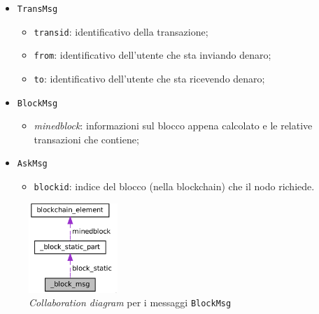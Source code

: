 \begin{itemize}
    \item \texttt{TransMsg}
    \begin{itemize}
        \item \texttt{transid}: identificativo della transazione;
        \item \texttt{from}: identificativo dell'utente che sta inviando denaro;
        \item \texttt{to}: identificativo dell'utente che sta ricevendo denaro;
    \end{itemize}
    \item \texttt{BlockMsg}
        \begin{itemize}
            \item \textit{minedblock}: informazioni sul blocco appena calcolato e le relative transazioni che contiene;
        \end{itemize}
    \item \texttt{AskMsg}
        \begin{itemize}
            \item \texttt{blockid}: indice del blocco (nella blockchain) che il nodo richiede.
        \end{itemize}
\end{itemize}
\begin{figure}[H]
    \centering
    \includegraphics[width=0.3\textwidth]{images/collaboration_block.png}
    \caption{\textit{Collaboration diagram} per i messaggi \texttt{BlockMsg}}
\end{figure}

